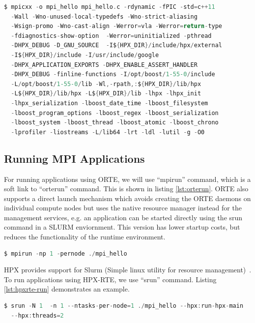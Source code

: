 \begin{lstlisting}[language=C, frame=single, basicstyle=\footnotesize, caption=Compile Line for Hello World\label{lst:compile}]
  $ mpicxx -o mpi_hello mpi_hello.c -rdynamic -fPIC -std=c++11
  -Wall -Wno-unused-local-typedefs -Wno-strict-aliasing
  -Wsign-promo -Wno-cast-align -Werror=vla -Werror=return-type
  -fdiagnostics-show-option  -Werror=uninitialized -pthread
  -DHPX_DEBUG -D_GNU_SOURCE  -I${HPX_DIR}/include/hpx/external
  -I${HPX_DIR}/include -I/usr/include/google
  -DHPX_APPLICATION_EXPORTS -DHPX_ENABLE_ASSERT_HANDLER
  -DHPX_DEBUG -finline-functions -I/opt/boost/1-55-0/include
  -L/opt/boost/1-55-0/lib -Wl,-rpath,:${HPX_DIR}/lib/hpx
  -L${HPX_DIR}/lib/hpx -L${HPX_DIR}/lib -lhpx -lhpx_init
  -lhpx_serialization -lboost_date_time -lboost_filesystem
  -lboost_program_options -lboost_regex -lboost_serialization
  -lboost_system -lboost_thread -lboost_atomic -lboost_chrono
  -lprofiler -liostreams -L/lib64 -lrt -ldl -lutil -g -O0
\end{lstlisting}


\subsection{Running MPI Applications}
For running applications using ORTE, we will use ``mpirun'' command, which is a soft link to ``orterun'' command. This is shown in listing \ref{lst:orterun}. ORTE also supports a direct launch mechanism which avoids creating the ORTE daemons on individual compute nodes but uses the native resource manager instead for the management services, e.g. an application can be started directly using the srun command in a SLURM enviornment. This version has lower startup costs, but reduces the functionality of the runtime environment.

\begin{lstlisting}[language=C, frame=single, basicstyle=\footnotesize, caption=Running MPI Applications Using ORTE \label{lst:orterun}]
$ mpirun -np 1 -pernode ./mpi_hello
\end{lstlisting}

HPX provides support for Slurm (Simple linux utility for resource management)~\cite{yoo2003slurm}. To run applications using HPX-RTE, we use ``srun'' command. Listing \ref{lst:hpxrte-run} demonstrates an example.

\begin{lstlisting}[language=C, frame=single, basicstyle=\footnotesize, caption=Running MPI Applications Using HPX-RTE \label{lst:hpxrte-run}]
$ srun -N 1  -n 1 --ntasks-per-node=1 ./mpi_hello --hpx:run-hpx-main
  --hpx:threads=2
\end{lstlisting}


